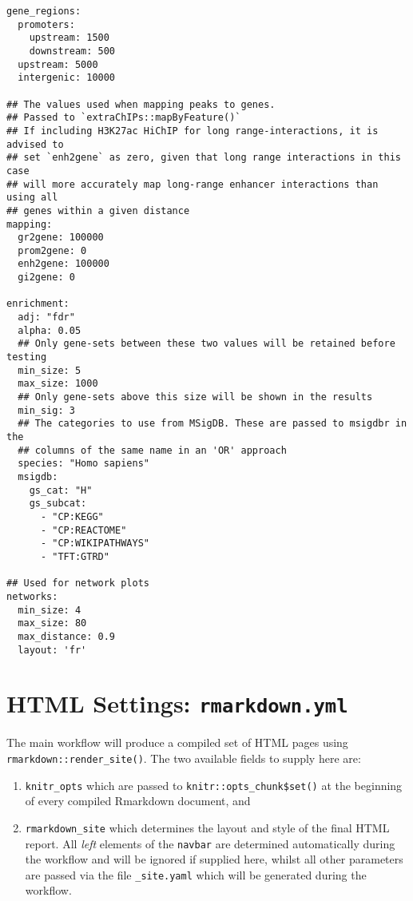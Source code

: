 \documentclass[
]{book}
\providecommand{\tightlist}{%
  \setlength{\itemsep}{0pt}\setlength{\parskip}{0pt}}
\begin{document}
\begin{verbatim}
gene_regions:
  promoters:
    upstream: 1500
    downstream: 500
  upstream: 5000
  intergenic: 10000

## The values used when mapping peaks to genes.
## Passed to `extraChIPs::mapByFeature()`
## If including H3K27ac HiChIP for long range-interactions, it is advised to
## set `enh2gene` as zero, given that long range interactions in this case
## will more accurately map long-range enhancer interactions than using all
## genes within a given distance
mapping:
  gr2gene: 100000
  prom2gene: 0
  enh2gene: 100000
  gi2gene: 0

enrichment:
  adj: "fdr"
  alpha: 0.05
  ## Only gene-sets between these two values will be retained before testing
  min_size: 5
  max_size: 1000
  ## Only gene-sets above this size will be shown in the results
  min_sig: 3
  ## The categories to use from MSigDB. These are passed to msigdbr in the
  ## columns of the same name in an 'OR' approach
  species: "Homo sapiens"
  msigdb:
    gs_cat: "H"
    gs_subcat:
      - "CP:KEGG"
      - "CP:REACTOME"
      - "CP:WIKIPATHWAYS"
      - "TFT:GTRD"

## Used for network plots
networks:
  min_size: 4
  max_size: 80
  max_distance: 0.9
  layout: 'fr'
\end{verbatim}

\hypertarget{rmarkdown-yml}{%
\section{\texorpdfstring{HTML Settings: \texttt{rmarkdown.yml}}{HTML Settings: rmarkdown.yml}}\label{rmarkdown-yml}}

The main workflow will produce a compiled set of HTML pages using \texttt{rmarkdown::render\_site()}\citep{R-rmarkdown}.
The two available fields to supply here are:

\begin{enumerate}
\def\labelenumi{\arabic{enumi}.}
\tightlist
\item
  \texttt{knitr\_opts} which are passed to \texttt{knitr::opts\_chunk\$set()}\citep{R-knitr} at the beginning of every compiled Rmarkdown document, and
\item
  \texttt{rmarkdown\_site} which determines the layout and style of the final HTML report.
  All \emph{left} elements of the \texttt{navbar} are determined automatically during the workflow and will be ignored if supplied here, whilst all other parameters are passed via the file \texttt{\_site.yaml} which will be generated during the workflow.
\end{enumerate}
\end{document}
